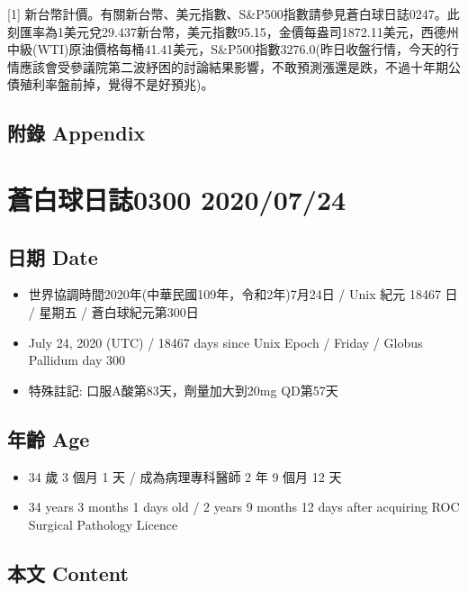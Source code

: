 \documentclass[
]{article}
\providecommand{\tightlist}{%
  \setlength{\itemsep}{0pt}\setlength{\parskip}{0pt}}
\begin{document}
{[}1{]}
新台幣計價。有關新台幣、美元指數、S\&P500指數請參見蒼白球日誌0247。此刻匯率為1美元兌29.437新台幣，美元指數95.15，金價每盎司1872.11美元，西德州中級(WTI)原油價格每桶41.41美元，S\&P500指數3276.0(昨日收盤行情，今天的行情應該會受參議院第二波紓困的討論結果影響，不敢預測漲還是跌，不過十年期公債殖利率盤前掉，覺得不是好預兆)。

\hypertarget{ux9644ux9304-appendix-20}{%
\subsection{附錄 Appendix}\label{ux9644ux9304-appendix-20}}

\hypertarget{ux84bcux767dux7403ux65e5ux8a8c0300-20200724}{%
\section{蒼白球日誌0300
2020/07/24}\label{ux84bcux767dux7403ux65e5ux8a8c0300-20200724}}

\hypertarget{ux65e5ux671f-date-21}{%
\subsection{日期 Date}\label{ux65e5ux671f-date-21}}

\begin{itemize}
\tightlist
\item
  世界協調時間2020年(中華民國109年，令和2年)7月24日 / Unix 紀元 18467 日
  / 星期五 / 蒼白球紀元第300日
\item
  July 24, 2020 (UTC) / 18467 days since Unix Epoch / Friday / Globus
  Pallidum day 300
\item
  特殊註記: 口服A酸第83天，劑量加大到20mg QD第57天
\end{itemize}

\hypertarget{ux5e74ux9f61-age-21}{%
\subsection{年齡 Age}\label{ux5e74ux9f61-age-21}}

\begin{itemize}
\tightlist
\item
  34 歲 3 個月 1 天 / 成為病理專科醫師 2 年 9 個月 12 天
\item
  34 years 3 months 1 days old / 2 years 9 months 12 days after
  acquiring ROC Surgical Pathology Licence
\end{itemize}

\hypertarget{ux672cux6587-content-21}{%
\subsection{本文 Content}\label{ux672cux6587-content-21}}
\end{document}
